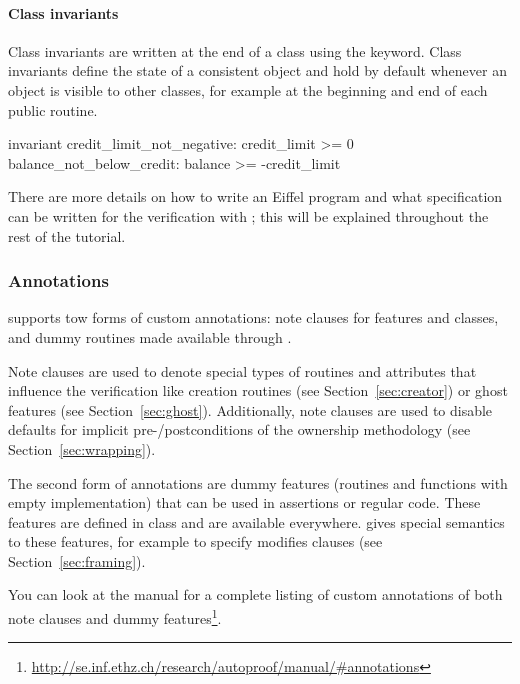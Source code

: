 \paragraph{Class invariants}

Class invariants are written at the end of a class using the  keyword. Class invariants define the state of a consistent object and hold by default whenever an object is visible to other classes, for example at the beginning and end of each public routine.

\begin{erunning}
invariant
	credit_limit_not_negative: credit_limit >= 0
	balance_not_below_credit: balance >= -credit_limit
\end{erunning}

There are more details on how to write an Eiffel program and what specification can be written for the verification with \AutoProof; this will be explained throughout the rest of the tutorial.

\subsubsection*{\AutoProof Annotations}

\AutoProof supports tow forms of custom annotations: note clauses for features and classes, and dummy routines made available through .

Note clauses are used to denote special types of routines and attributes that influence the verification like creation routines (see Section~\ref{sec:creator}) or ghost features (see Section~\ref{sec:ghost}). Additionally, note clauses are used to disable defaults for implicit pre-/postconditions of the ownership methodology (see Section~\ref{sec:wrapping}). %

The second form of \AutoProof annotations are dummy features (routines and functions with empty implementation) that can be used in assertions or regular code. These features are defined in class  and are available everywhere. \AutoProof gives special semantics to these features, for example to specify modifies clauses (see Section~\ref{sec:framing}).

You can look at the \AutoProof manual for a complete listing of custom annotations of both note clauses and dummy features\footnote{\url{http://se.inf.ethz.ch/research/autoproof/manual/\#annotations}}.

